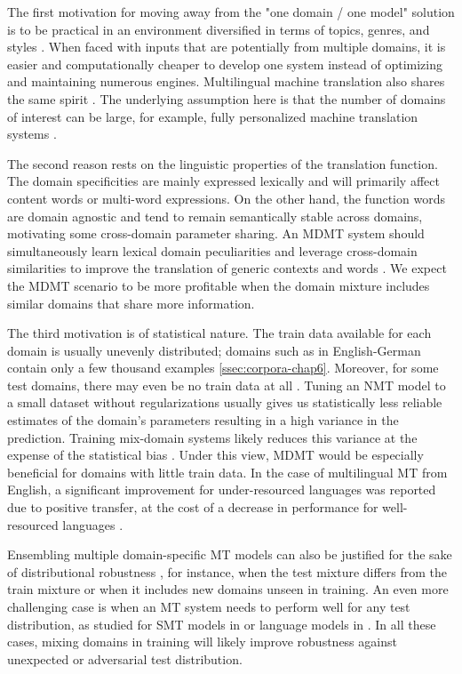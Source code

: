The first motivation for moving away from the "one domain / one model" solution is to be practical in an environment diversified in terms of topics, genres, and styles \citep{Sennrich13multidomain,Farajian17neural}. When faced with inputs that are potentially from multiple domains, it is easier and computationally cheaper to develop one system instead of optimizing and maintaining numerous engines. Multilingual machine translation also shares the same spirit \citep{johnson17googles}. The underlying assumption here is that the number of domains of interest can be large, for example, fully personalized machine translation systems \citep{Michel18extreme}.

The second reason rests on the linguistic properties of the translation function. The domain specificities are mainly expressed lexically and will primarily affect content words or multi-word expressions. On the other hand, the function words are domain agnostic and tend to remain semantically stable across domains, motivating some cross-domain parameter sharing. An MDMT system should simultaneously learn lexical domain peculiarities and leverage cross-domain similarities to improve the translation of generic contexts and words \citep{Zeng18multidomain,Pham19generic,Jiang20Multi}. We expect the MDMT scenario to be more profitable when the domain mixture includes similar domains that share more information.

The third motivation is of statistical nature. The train data available for each domain is usually unevenly distributed; domains such as  in English-German contain only a few thousand examples \ref{ssec:corpora-chap6}. Moreover, for some test domains, there may even be no train data at all \citep{Farajian17neural}. Tuning an NMT model to a small dataset without regularizations usually gives us statistically less reliable estimates of the domain's parameters resulting in a high variance in the prediction. Training mix-domain systems likely reduces this variance at the expense of the statistical bias \citep{Clark12onesystem}. Under this view, MDMT would be especially beneficial for domains with little train data. In the case of multilingual MT from English, a significant improvement for under-resourced languages was reported due to positive transfer, at the cost of a decrease in performance for well-resourced languages \citep{Arivazhagan19massively}.

Ensembling multiple domain-specific MT models can also be justified for the sake of distributional robustness \citep{Mansour09domain,Mansour09multiple,Sennrich12perplexity,Sennrich12mixture,Carpuat14linear,Freitag16fast, Sajjad17neural,Saunders19domain}, for instance, when the test mixture differs from the train mixture or when it includes new domains unseen in training. An even more challenging case is when an MT system needs to perform well for any test distribution, as studied for SMT models in \citet{Huck15mixeddomain} or language models in \citet{Oren19distributionally}. In all these cases, mixing domains in training will likely improve robustness against unexpected or adversarial test distribution.

